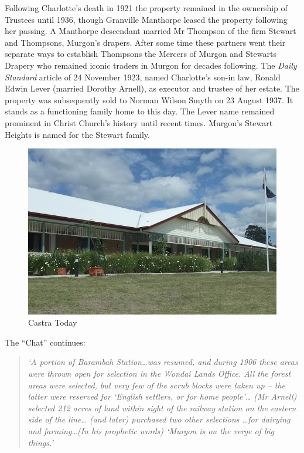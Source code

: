 Following Charlotte's death in 1921 the property remained in the ownership of Trustees until 1936, though Granville Manthorpe leased the property following her passing. A Manthorpe descendant married Mr Thompson of the firm Stewart and Thompsons, Murgon's drapers. After some time these partners went their separate ways to establish Thompsons the Mercers of Murgon and Stewarts Drapery who remained iconic traders in Murgon for decades following. The \emph{Daily Standard} article of 24 November 1923, named Charlotte's son-in law, Ronald Edwin Lever (married Dorothy Arnell), as executor and trustee of her estate. The property was subsequently sold to Norman Wilson Smyth on 23 August 1937. It stands as a functioning family home to this day. The Lever name remained prominent in Christ Church's history until recent times. Murgon's Stewart Heights is named for the Stewart family.









\begin{figure}
\begin{center}
\includegraphics[width=1.\linewidth,center]{../images/castraToday.png}
\caption{Castra Today}
\end{center}
\end{figure}




The ``Chat'' continues:



\begin{quote}

\emph{`A portion of Barambah Station\ldots was resumed, and during 1906 these areas were thrown open for selection in the Wondai Lands Office. All the forest areas were selected, but very few of the scrub blocks were taken up -- the latter were reserved for `English settlers, or for home people'\ldots{} (Mr Arnell) selected 212 acres of land within sight of the railway station on the eastern side of the line\ldots{} (and later) purchased two other selections \ldots for dairying and farming\ldots(In his prophetic words) `Murgon is on the verge of big things.'}

\end{quote}



